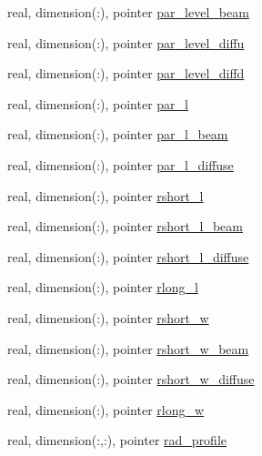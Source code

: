 \begin{DoxyCompactItemize}
real, dimension(\+:), pointer \hyperlink{structed__state__vars_1_1patchtype_a9825754323f6d3fc5129e3a8ec014009}{par\+\_\+level\+\_\+beam}
\item 
real, dimension(\+:), pointer \hyperlink{structed__state__vars_1_1patchtype_add3ad43a7014a3ee161a568284e18c2c}{par\+\_\+level\+\_\+diffu}
\item 
real, dimension(\+:), pointer \hyperlink{structed__state__vars_1_1patchtype_a8121e1650409c35fcd565d63215fe051}{par\+\_\+level\+\_\+diffd}
\item 
real, dimension(\+:), pointer \hyperlink{structed__state__vars_1_1patchtype_adf0813a731ebbe9e4f1266622a6db9c8}{par\+\_\+l}
\item 
real, dimension(\+:), pointer \hyperlink{structed__state__vars_1_1patchtype_ade6134efe65b24fa32019162c1c88100}{par\+\_\+l\+\_\+beam}
\item 
real, dimension(\+:), pointer \hyperlink{structed__state__vars_1_1patchtype_ad6f0dd822bbe665fadac7e86226dccf2}{par\+\_\+l\+\_\+diffuse}
\item 
real, dimension(\+:), pointer \hyperlink{structed__state__vars_1_1patchtype_a5163e900598e9c939150eac6ae35f885}{rshort\+\_\+l}
\item 
real, dimension(\+:), pointer \hyperlink{structed__state__vars_1_1patchtype_aa50cc308025f473c871294c8d69efea1}{rshort\+\_\+l\+\_\+beam}
\item 
real, dimension(\+:), pointer \hyperlink{structed__state__vars_1_1patchtype_aff668c8cc71b7d8d8c9c2bcd1144bd07}{rshort\+\_\+l\+\_\+diffuse}
\item 
real, dimension(\+:), pointer \hyperlink{structed__state__vars_1_1patchtype_a75aa42454547333ba8103009497eba5c}{rlong\+\_\+l}
\item 
real, dimension(\+:), pointer \hyperlink{structed__state__vars_1_1patchtype_adf7335cbdb53ab2a6cd477755220f1d1}{rshort\+\_\+w}
\item 
real, dimension(\+:), pointer \hyperlink{structed__state__vars_1_1patchtype_a5fa47036da1579f9464725c7ac6ad4d6}{rshort\+\_\+w\+\_\+beam}
\item 
real, dimension(\+:), pointer \hyperlink{structed__state__vars_1_1patchtype_afed73b5c81acdc1f99cdda56a72fef9a}{rshort\+\_\+w\+\_\+diffuse}
\item 
real, dimension(\+:), pointer \hyperlink{structed__state__vars_1_1patchtype_a9143ede8da852cd226b694de9fc36dc7}{rlong\+\_\+w}
\item 
real, dimension(\+:,\+:), pointer \hyperlink{structed__state__vars_1_1patchtype_a99d1220240dfdeefb20aa25f5d2cfc0a}{rad\+\_\+profile}

\end{DoxyCompactItemize}
